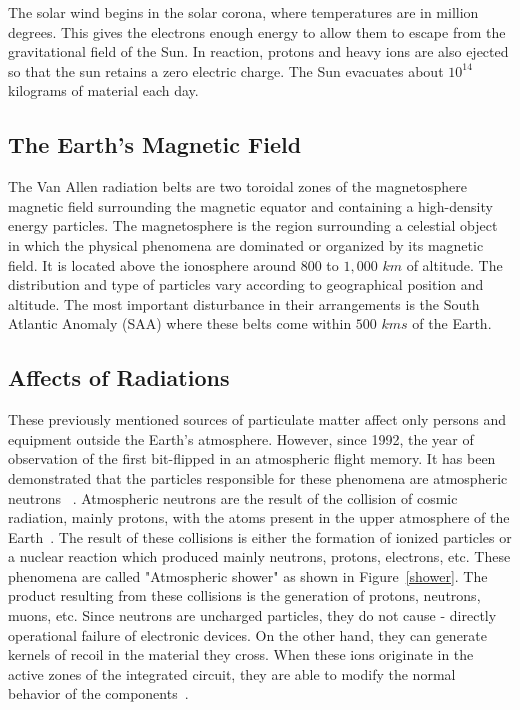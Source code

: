The solar wind begins in the solar corona, where temperatures are in million degrees. This gives the electrons enough energy to allow them to
escape from the gravitational field of the Sun. In reaction, protons and heavy ions are also ejected so that the sun retains a zero electric charge. The Sun evacuates about $10^{14}$ kilograms of material each day. 


\subsection{The Earth's Magnetic Field}

The Van Allen radiation belts are two toroidal zones of the magnetosphere magnetic field surrounding the magnetic equator and containing a high-density
energy particles. The magnetosphere is the region surrounding a celestial object in which the
physical phenomena are dominated or organized by its magnetic field. It is located above the ionosphere around $800$ to $1,000$ $km$ of altitude. The distribution and type of particles vary according to geographical position and altitude. The most important disturbance in their arrangements is the South Atlantic Anomaly (SAA) where these belts come within $500$ $kms$ of the Earth.

\subsection{Affects of Radiations}
These previously mentioned sources of particulate matter affect only persons and equipment
outside the Earth's atmosphere. However, since 1992, the year of observation of the first
bit-flipped in an atmospheric flight memory. It has been demonstrated that the particles responsible for these
phenomena are atmospheric neutrons ~\cite{leray2004atmospheric}.
Atmospheric neutrons are the result of the collision of cosmic radiation,
mainly protons, with the atoms present in the upper atmosphere of the Earth~\cite{guenzer1979single}. The result of these collisions is either the formation of ionized particles or a nuclear reaction which
produced mainly neutrons, protons, electrons, etc. These phenomena are called
"Atmospheric shower" as \cite{ziegler1996ibm} shown in Figure~\ref{shower}. The product resulting from these collisions is the generation of
protons, neutrons, muons, etc. Since neutrons are uncharged particles, they do not
cause  - directly operational failure of electronic devices. On the other hand, they can generate kernels of recoil in
the material they cross. When these ions originate in the active zones of the integrated circuit, they are able to modify the normal behavior of the components~\cite{normand1998extensions}.
%


